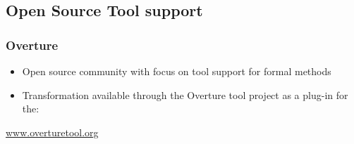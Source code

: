 \subsection{Open Source Tool support}
%
%
\frame
{
  \frametitle{Overture}

  \begin{itemize}
  		\item<1-> Open source community with focus on tool support for formal methods
  		\item<2-> Transformation available through the Overture tool project as a plug-in for the:
  \end{itemize}

\pause
 \begin{center} 
	\vspace{1cm}
  \LARGE {}

\vspace{2cm}
	\href{www.overturetool.org}{www.overturetool.org}
  

\end{center}
}

